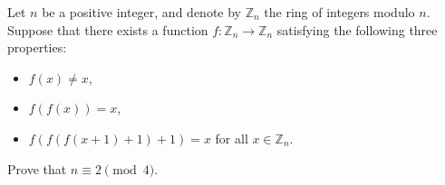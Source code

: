Let \(n\) be a positive integer, and denote by \(\mathbb{Z}_n\) the ring of integers modulo \(n\). Suppose that there exists a function \(f\colon \mathbb{Z}_n\to\mathbb{Z}_n\) satisfying the following three properties:
\begin{itemize}
\item[(i)] \(f(x)\neq x\),
\item[(ii)] \(f(f(x))=x\),
\item[(iii)] \(f(f(f(x+1)+1)+1)=x\) for all \(x\in\mathbb{Z}_n\).
\end{itemize}
Prove that \(n\equiv 2 \pmod4\).